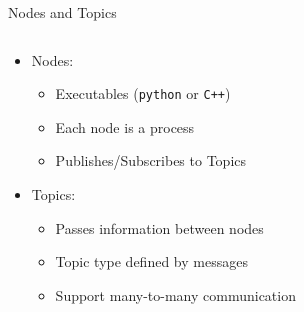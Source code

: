 \documentclass[aspectratio=43]{beamer}
\begin{document}
\begin{frame}{Nodes and Topics}
	\begin{columns}[c]
		\begin{column}{0.5\textwidth}
			\begin{itemize}[<+->]
				\item Nodes:
					\begin{itemize}
					\item Executables (\texttt{python} or \texttt{C++})
					\item Each node is a process
					\item Publishes/Subscribes to Topics
					\end{itemize}
				\item Topics:
					\begin{itemize}
					\item Passes information between nodes
					\item Topic type defined by messages
					\item Support many-to-many communication
					\end{itemize}
			\end{itemize}
		\end{column}
		\begin{column}{0.5\textwidth}
		\end{column}
	\end{columns}
\end{frame}
\end{document}
